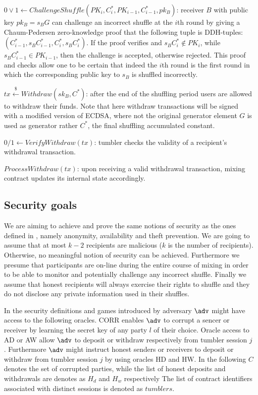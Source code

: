 \documentclass[a4paper]{article}
\theoremstyle{definition}
\begin{document}
$0\lor1\leftarrow 
ChallengeShuffle(PK_{i},C^{*}_{i},PK_{i-1},C^{*}_{i-1},pk_{B})$: receiver $B$ with public key $pk_{B}=s_{B}G$ can challenge an incorrect shuffle at the $i$th round by giving a Chaum-Pedersen zero-knowledge proof that the following tuple is DDH-tuples: $(C^{*}_{i-1}, s_{B}C^{*}_{i-1}, C^{*}_{i}, s_{B}C^{*}_{i})$. If the proof verifies and $s_{B}C^{*}_{i} \notin PK_{i}$, while $s_{B}C^{*}_{i-1} \in PK_{i-1}$, then the challenge is accepted, otherwise rejected. This proof and checks allow one to be certain that indeed the $i$th round is the first round in which the corresponding public key to $s_{B}$ is shuffled incorrectly.  

$tx\stackrel{\$}{\leftarrow}Withdraw(sk_B, C^{*})$: after the end of the shuffling period users are allowed to withdraw their funds. Note that here withdraw transactions will be signed with a modified version of ECDSA, where not the original generator element $G$ is used as generator rather $C^{*}$, the final shuffling accumulated constant.

$0/1\leftarrow VerifyWithdraw(tx)$: tumbler checks the validity of a recipient's withdrawal transaction.

$ProcessWithdraw(tx)$: upon receiving a valid withdrawal transaction, mixing contract updates its internal state accordingly.

\subsection{Security goals} \label{securitygoals}
We are aiming to achieve and prove the same notions of security as the ones defined in \cite{meiklejohn2018mobius}, namely anonymity, availability and theft prevention. We are going to assume that at most $k-2$ recipients are malicious ($k$ is the number of recipients). Otherwise, no meaningful notion of security can be achieved. Furthermore we presume that participants are on-line during the entire course of mixing in order to be able to monitor and potentially challenge any incorrect shuffle. Finally we assume that honest recipients will always exercise their rights to shuffle and they do not disclose any private information used in their shuffles.

In the security definitions and games introduced by \cite{meiklejohn2018mobius} adversary $\adv$ might have access to the following oracles. CORR enables $\adv$ to corrupt a sencer or receiver by learning the secret key of any party $l$ of their choice. Oracle access to AD or AW allow $\adv$ to deposit or withdraw respectively from tumbler session $j$. Furthermore $\adv$ might instruct honest senders or receivers to deposit or withdraw from tumbler session $j$ by using oracles HD and HW. In the following $C$ denotes the set of corrupted parties, while the list of honest deposits and withdrawals are denotes as $H_{d}$ and $H_{w}$ respectively The list of contract identifiers associated with distinct sessions is denoted as $tumblers$.     
\end{document}
